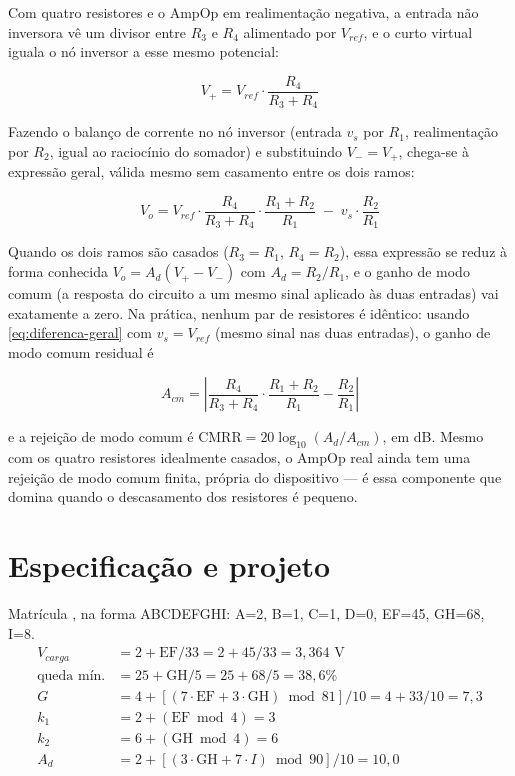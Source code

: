 \documentclass[11pt,a4paper]{article}
\begin{document}
Com quatro resistores e o AmpOp em realimentação negativa, a entrada não inversora vê um
divisor entre $R_3$ e $R_4$ alimentado por $V_{ref}$, e o curto virtual iguala o nó inversor a
esse mesmo potencial:

\begin{equation}
V_+ = V_{ref}\cdot\frac{R_4}{R_3+R_4}
\label{eq:diferenca-vmais}
\end{equation}

Fazendo o balanço de corrente no nó inversor (entrada $v_s$ por $R_1$, realimentação por $R_2$,
igual ao raciocínio do somador) e substituindo $V_-=V_+$, chega-se à expressão geral, válida
mesmo sem casamento entre os dois ramos:

\begin{equation}
V_o = V_{ref}\cdot\frac{R_4}{R_3+R_4}\cdot\frac{R_1+R_2}{R_1} \; - \; v_s\cdot\frac{R_2}{R_1}
\label{eq:diferenca-geral}
\end{equation}

Quando os dois ramos são casados ($R_3=R_1$, $R_4=R_2$), essa expressão se reduz à forma
conhecida $V_o = A_d(V_+-V_-)$ com $A_d=R_2/R_1$, e o ganho de modo comum (a resposta do
circuito a um mesmo sinal aplicado às duas entradas) vai exatamente a zero. Na prática, nenhum
par de resistores é idêntico: usando \eqref{eq:diferenca-geral} com $v_s=V_{ref}$ (mesmo sinal
nas duas entradas), o ganho de modo comum residual é

\begin{equation}
A_{cm} = \left|\frac{R_4}{R_3+R_4}\cdot\frac{R_1+R_2}{R_1} - \frac{R_2}{R_1}\right|
\label{eq:acm}
\end{equation}

e a rejeição de modo comum é $\text{CMRR} = 20\log_{10}(A_d/A_{cm})$, em dB. Mesmo com os quatro
resistores idealmente casados, o AmpOp real ainda tem uma rejeição de modo comum finita, própria
do dispositivo — é essa componente que domina quando o descasamento dos resistores é pequeno.

\section{Especificação e projeto}

\begin{espec}
Matrícula , na forma ABCDEFGHI: A=2, B=1, C=1, D=0, EF=45, GH=68, I=8.
\begin{align*}
V_{carga} &= 2+\text{EF}/33 = 2+45/33 = 3{,}364\text{ V} \\
\text{queda mín.} &= 25+\text{GH}/5 = 25+68/5 = 38{,}6\% \\
G &= 4+\left[(7\cdot\text{EF}+3\cdot\text{GH})\bmod 81\right]/10 = 4+33/10 = 7{,}3 \\
k_1 &= 2+(\text{EF}\bmod 4) = 3 \\
k_2 &= 6+(\text{GH}\bmod 4) = 6 \\
A_d &= 2+\left[(3\cdot\text{GH}+7\cdot I)\bmod 90\right]/10 = 10{,}0
\end{align*}
\end{espec}
\end{document}
